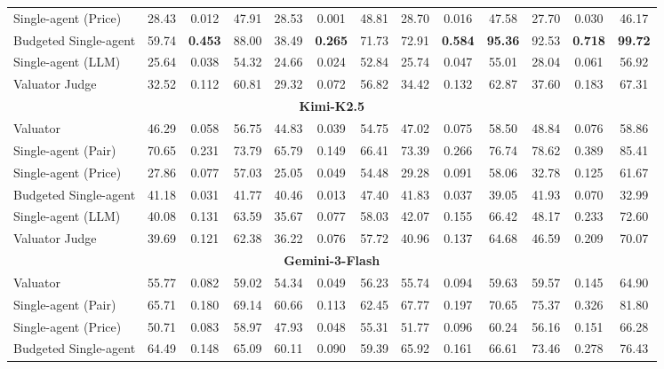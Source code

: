 \begin{table}[!t]
{\begin{tabular}{lcccccccccccc}
Single-agent (Price)         & 28.43 & 0.012 & 47.91 & 28.53 & 0.001 & 48.81 & 28.70 & 0.016 & 47.58 & 27.70 & 0.030 & 46.17 \\
Budgeted Single-agent        & 59.74 & \textbf{0.453} & 88.00 & 38.49 & \textbf{0.265} & 71.73 & 72.91 & \textbf{0.584} & \textbf{95.36} & 92.53 & \textbf{0.718} & \textbf{99.72} \\
Single-agent (LLM)           & 25.64 & 0.038 & 54.32 & 24.66 & 0.024 & 52.84 & 25.74 & 0.047 & 55.01 & 28.04 & 0.061 & 56.92 \\
Valuator Judge               & 32.52 & 0.112 & 60.81 & 29.32 & 0.072 & 56.82 & 34.42 & 0.132 & 62.87 & 37.60 & 0.183 & 67.31 \\
\midrule
\multicolumn{13}{c}{\textbf{Kimi-K2.5}} \\
\midrule
Valuator                     & 46.29 & 0.058 & 56.75 & 44.83 & 0.039 & 54.75 & 47.02 & 0.075 & 58.50 & 48.84 & 0.076 & 58.86 \\
Single-agent (Pair)          & 70.65 & 0.231 & 73.79 & 65.79 & 0.149 & 66.41 & 73.39 & 0.266 & 76.74 & 78.62 & 0.389 & 85.41 \\
Single-agent (Price)         & 27.86 & 0.077 & 57.03 & 25.05 & 0.049 & 54.48 & 29.28 & 0.091 & 58.06 & 32.78 & 0.125 & 61.67 \\
Budgeted Single-agent        & 41.18 & 0.031 & 41.77 & 40.46 & 0.013 & 47.40 & 41.83 & 0.037 & 39.05 & 41.93 & 0.070 & 32.99 \\
Single-agent (LLM)           & 40.08 & 0.131 & 63.59 & 35.67 & 0.077 & 58.03 & 42.07 & 0.155 & 66.42 & 48.17 & 0.233 & 72.60 \\
Valuator Judge               & 39.69 & 0.121 & 62.38 & 36.22 & 0.076 & 57.72 & 40.96 & 0.137 & 64.68 & 46.59 & 0.209 & 70.07 \\
\midrule
\multicolumn{13}{c}{\textbf{Gemini-3-Flash}} \\
\midrule
Valuator                     & 55.77 & 0.082 & 59.02 & 54.34 & 0.049 & 56.23 & 55.74 & 0.094 & 59.63 & 59.57 & 0.145 & 64.90 \\
Single-agent (Pair)          & 65.71 & 0.180 & 69.14 & 60.66 & 0.113 & 62.45 & 67.77 & 0.197 & 70.65 & 75.37 & 0.326 & 81.80 \\
Single-agent (Price)         & 50.71 & 0.083 & 58.97 & 47.93 & 0.048 & 55.31 & 51.77 & 0.096 & 60.24 & 56.16 & 0.151 & 66.28 \\
Budgeted Single-agent        & 64.49 & 0.148 & 65.09 & 60.11 & 0.090 & 59.39 & 65.92 & 0.161 & 66.61 & 73.46 & 0.278 & 76.43 \\

\end{tabular}}
\end{table}
